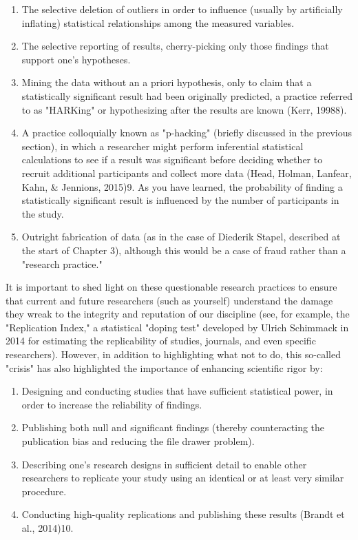 \begin{enumerate}
\item The selective deletion of outliers in order to influence (usually by artificially inflating) statistical relationships among the measured variables.

\item The selective reporting of results, cherry-picking only those findings that support one's hypotheses. 
\item Mining the data without an a priori hypothesis, only to claim that a statistically significant result had been originally predicted, a practice referred to as "HARKing" or hypothesizing after the results are known (Kerr, 19988).

\item A practice colloquially known as "p-hacking" (briefly discussed in the previous section), in which a researcher might perform inferential statistical calculations to see if a result was significant before deciding whether to recruit additional participants and collect more data (Head, Holman, Lanfear, Kahn, \& Jennions, 2015)9. As you have learned, the probability of finding a statistically significant result is influenced by the number of participants in the study.

\item Outright fabrication of data (as in the case of Diederik Stapel, described at the start of Chapter 3), although this would be a case of fraud rather than a "research practice."

\end{enumerate}

It is important to shed light on these questionable research practices to ensure that current and future researchers (such as yourself) understand the damage they wreak to the integrity and reputation of our discipline (see, for example, the "Replication Index," a statistical "doping test" developed by Ulrich Schimmack in 2014 for estimating the replicability of studies, journals, and even specific researchers). However, in addition to highlighting what not to do, this so-called "crisis" has also highlighted the importance of enhancing scientific rigor by:


\begin{enumerate}
\item Designing and conducting studies that have sufficient statistical power, in order to increase the reliability of findings.

\item Publishing both null and significant findings (thereby counteracting the publication bias and reducing the file drawer problem).

\item Describing one's research designs in sufficient detail to enable other researchers to replicate your study using an identical or at least very similar procedure.

\item Conducting high-quality replications and publishing these results (Brandt et al., 2014)10.

\end{enumerate}

